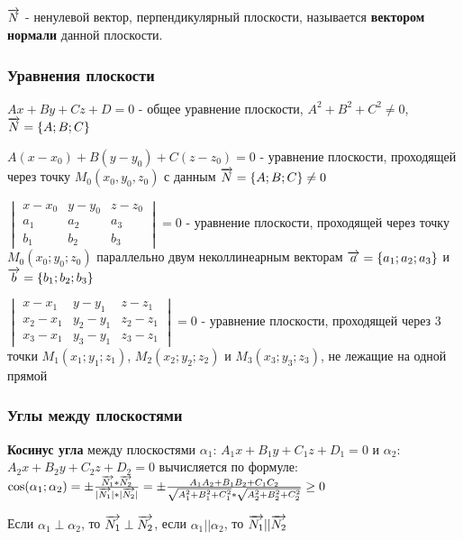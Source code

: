 \documentclass{article}
\def\vec{\ensuremath\overrightarrow}
\begin{document}
\begin{flushleft}

$\vec{N}$ - ненулевой вектор, перпендикулярный плоскости, называется \textbf{вектором нормали} данной плоскости.

\subsubsection{Уравнения плоскости}

$Ax + By + C z + D = 0$ - общее уравнение плоскости, $A^2 + B^2 + C^2 \ne 0$, $\vec{N} = \{ A; B; C \}$

$A(x - x_0) + B(y - y_0) + C(z - z_0) = 0$ - уравнение плоскости, проходящей через точку $M_0(x_0, y_0, z_0)$ с данным $\vec{N} = \{ A; B; C \} \ne 0$ 


$\begin{vmatrix}
    x - x_0 & y - y_0 & z - z_0 \\
    a_1 & a_2 & a_3 \\
    b_1 & b_2 & b_3
\end{vmatrix} = 0$ - 
уравнение плоскости, проходящей через точку $M_0(x_0; y_0; z_0)$ параллельно двум неколлинеарным векторам $\vec{a} = \{ a_1; a_2; a_3 \}$ и $\vec{b} = \{ b_1; b_2; b_3 \}$

$\begin{vmatrix}
    x - x_1 & y - y_1 & z - z_1 \\
    x_2 - x_1 & y_2 - y_1 & z_2 - z_1 \\
    x_3 - x_1 & y_3 - y_1 & z_3 - z_1
\end{vmatrix} = 0$ - уравнение плоскости, проходящей через 3 точки $M_1(x_1; y_1; z_1)$, $M_2(x_2; y_2; z_2)$ и $M_3(x_3; y_3; z_3)$, не лежащие на одной прямой

\subsubsection{Углы между плоскостями}

\textbf{Косинус угла} между плоскостями $\alpha_1$: $A_1 x + B_1 y + C_1 z + D_1 = 0$ и $\alpha_2$: $A_2 x + B_2 y + C_2 z + D_2 = 0$ вычисляется по формуле: $\cos (\alpha_1; \alpha_2) = \pm \frac{\vec{N_1} * \vec{N_2}}{|\vec{N_1}| * |\vec{N_2}|} = \pm \frac{A_1 A_2 + B_1 B_2 + C_1 C_2}{\sqrt{A_1^2 + B_1^2 + C_1^2} * \sqrt{A_2^2 + B_2^2 + C_2^2}} \ge 0$

Если $\alpha_1 \perp \alpha_2$, то $\vec{N_1} \perp \vec{N_2}$, если $\alpha_1 || \alpha_2$, то $\vec{N_1} || \vec{N_2}$


\end{flushleft}
\end{document}
